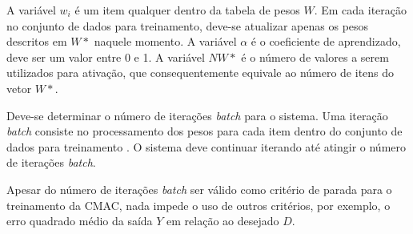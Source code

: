 A variável $w_{i}$ é um item qualquer dentro da tabela de pesos $W$. 
Em cada iteração no conjunto de dados para treinamento, deve-se atualizar apenas os pesos descritos em $W*$ naquele momento. 
A variável $\alpha$ é o coeficiente de aprendizado, deve ser um valor entre 0 e 1. 
A variável $NW*$ é o número de valores a serem utilizados para ativação, que consequentemente equivale ao número de itens do vetor $W*$.

Deve-se determinar o número de iterações \emph{batch} para o sistema. 
Uma iteração \emph{batch} consiste no processamento dos pesos para cada item dentro do conjunto de dados para treinamento \cite{Ng2015}. 
O sistema deve continuar iterando até atingir o número de iterações \emph{batch}.

Apesar do número de iterações \emph{batch} ser válido como critério de parada para o treinamento da CMAC, nada impede o uso de outros critérios, por exemplo, o erro quadrado médio da saída $Y$ em relação ao desejado $D$.
